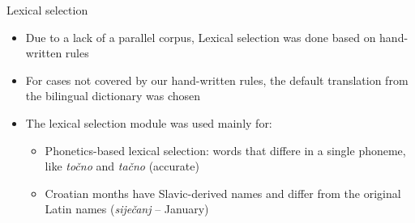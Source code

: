 \documentclass{beamer}
\begin{document}
\begin{frame}{Lexical selection}
\begin{itemize}
\item Due to a lack of a parallel corpus, Lexical selection was done based on hand-written rules
\item For cases not covered by our hand-written rules, the default translation from the bilingual dictionary was chosen
\item The lexical selection module was used mainly for:
\begin{itemize}
	\item Phonetics-based lexical selection: words that differe in a single phoneme, like \emph{točno} and \emph{tačno} (accurate)
	\item Croatian months have Slavic-derived names and differ from the original Latin names (\emph{siječanj} -- January)
\end{itemize}
\end{itemize}
\end{frame}
\end{document}

